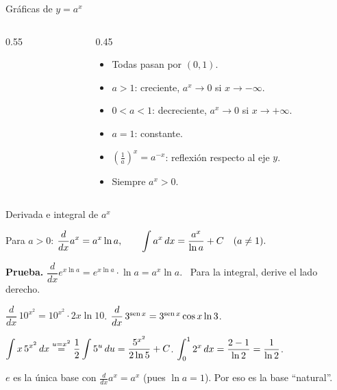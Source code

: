 \documentclass[10pt,aspectratio=169]{beamer}
\begin{document}
\begin{frame}{Gráficas de $y=a^x$}
  \begin{columns}
    \begin{column}{0.55\textwidth}
      \centering
    \end{column}
    \begin{column}{0.45\textwidth}
      \begin{itemize}
        \item Todas pasan por $(0,1)$.
        \item $a>1$: creciente, $a^x\to0$ si $x\to-\infty$.
        \item $0<a<1$: decreciente, $a^x\to0$ si $x\to+\infty$.
        \item $a=1$: constante.
        \item $\left(\frac1a\right)^x=a^{-x}$: reflexión respecto al eje $y$.
        \item Siempre $a^x>0$.
      \end{itemize}
    \end{column}
  \end{columns}
\end{frame}

\begin{frame}{Derivada e integral de $a^x$}
  \begin{teorema}
    Para $a>0$:\qquad
    $\displaystyle\frac{d}{dx}a^x=a^x\ln a,\qquad \int a^x\,dx=\frac{a^x}{\ln a}+C\quad(a\ne1).$
  \end{teorema}
  \textbf{Prueba.} $\dfrac{d}{dx}e^{x\ln a}=e^{x\ln a}\cdot\ln a=a^x\ln a$. \ Para la integral, derive el lado derecho.
  \begin{ejemplo}[1]
    $\dfrac{d}{dx}\,10^{x^2}=10^{x^2}\cdot2x\ln10$.\qquad
    $\dfrac{d}{dx}\,3^{\operatorname{sen} x}=3^{\operatorname{sen} x}\cos x\ln3$.
  \end{ejemplo}
  \begin{ejemplo}[2]
    $\displaystyle\int x\,5^{x^2}\,dx\overset{u=x^2}{=}\frac12\int5^u\,du=\frac{5^{x^2}}{2\ln5}+C$.
    \qquad
    $\displaystyle\int_0^1 2^x\,dx=\frac{2-1}{\ln2}=\frac{1}{\ln 2}$.
  \end{ejemplo}
  \begin{observacion}
    $e$ es la única base con $\frac{d}{dx}a^x=a^x$ (pues $\ln a=1$). Por eso es la base ``natural''.
  \end{observacion}
\end{frame}
\end{document}
